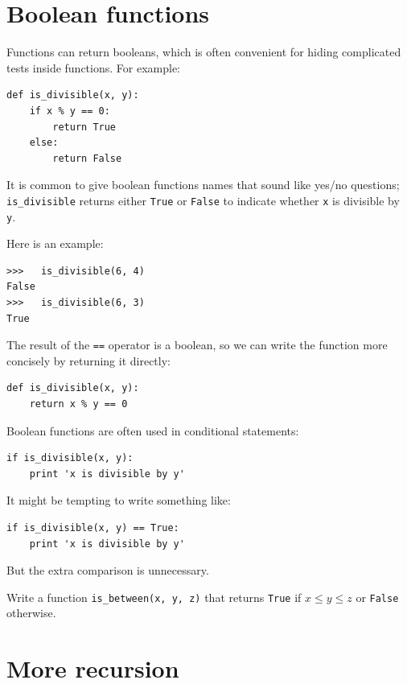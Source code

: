 \documentclass[10pt]{book}
\begin{document}
\section{Boolean functions}
\label{boolean}


Functions can return booleans, which is often convenient for hiding
complicated tests inside functions.  For example:

\beforeverb
\begin{verbatim}
def is_divisible(x, y):
    if x % y == 0:
        return True
    else:
        return False
\end{verbatim}
\afterverb
%
It is common to give boolean functions names that sound like yes/no
questions; \verb"is_divisible" returns either {\tt True} or {\tt False}
to indicate whether {\tt x} is divisible by {\tt y}.

Here is an example:

\beforeverb
\begin{verbatim}
>>>   is_divisible(6, 4)
False
>>>   is_divisible(6, 3)
True
\end{verbatim}
\afterverb
%
The result of the {\tt ==} operator is a boolean, so we can write the
function more concisely by returning it directly:

\beforeverb
\begin{verbatim}
def is_divisible(x, y):
    return x % y == 0
\end{verbatim}
\afterverb
%
Boolean functions are often used in conditional statements:


\beforeverb
\begin{verbatim}
if is_divisible(x, y):
    print 'x is divisible by y'
\end{verbatim}
\afterverb
%
It might be tempting to write something like:

\beforeverb
\begin{verbatim}
if is_divisible(x, y) == True:
    print 'x is divisible by y'
\end{verbatim}
\afterverb
%
But the extra comparison is unnecessary.

\begin{ex}
Write a function \verb"is_between(x, y, z)" that
returns {\tt True} if $x \le y \le z$ or {\tt False} otherwise.
\end{ex}


\section{More recursion}
\end{document}
